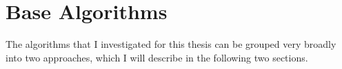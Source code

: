 \chapter{Base Algorithms}
The algorithms that I investigated for this thesis can be grouped very broadly into two approaches, which I will describe in the following two sections.

